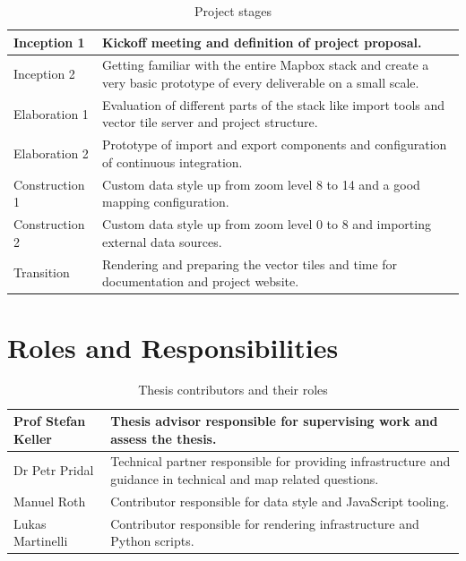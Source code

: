\begin{table}[H]
    \begin{tabular}{p{2.5cm} p{10cm}}
	Inception 1 & Kickoff meeting and
  definition of project proposal. \\ \hline

	Inception 2 & Getting familiar with the entire Mapbox stack and create a very basic prototype of every deliverable on a small scale. \\ \hline

	Elaboration 1 & Evaluation of different parts of the
  stack like import tools and vector tile server and project structure. \\ \hline
  Elaboration 2  & Prototype of import and export components and configuration of continuous integration.
\\ \hline

  Construction 1 & Custom data style up from zoom level 8 to 14 and a good mapping configuration.\\ \hline
  Construction 2 & Custom data style up from zoom level 0 to 8 and importing external data sources. \\ \hline
  Transition & Rendering and preparing the vector tiles and time for documentation and project website.\\ \hline
    \end{tabular}
    \caption{Project stages}
\end{table}

\section{Roles and Responsibilities}\label{roles-and-responsibilities}

\begin{table}[H]
    \begin{tabular}{p{3cm} p{9.5cm}}
Prof Stefan Keller & Thesis advisor responsible for supervising work and
assess the thesis.\\ \hline
Dr Petr Pridal &
Technical partner responsible for providing infrastructure and guidance in technical and map related questions.\\ \hline
Manuel Roth &
Contributor responsible for data style and JavaScript tooling.\\ \hline
Lukas Martinelli &
Contributor responsible for rendering infrastructure and Python scripts.\\ \hline
    \end{tabular}
    \caption{Thesis contributors and their roles}
\end{table}

